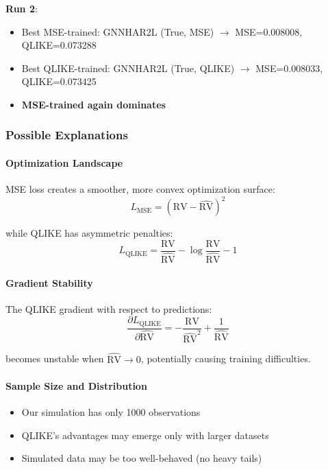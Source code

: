 \documentclass[10pt,a4paper]{article}
\newcommand{\RV}{\text{RV}}
\begin{document}
\textbf{Run 2}:
\begin{itemize}
\item Best MSE-trained: GNNHAR2L (True, MSE) $\to$ MSE=0.008008, QLIKE=0.073288
\item Best QLIKE-trained: GNNHAR2L (True, QLIKE) $\to$ MSE=0.008033, QLIKE=0.073425
\item \textbf{MSE-trained again dominates}
\end{itemize}

\subsubsection{Possible Explanations}

\paragraph{Optimization Landscape}
MSE loss creates a smoother, more convex optimization surface:
\begin{equation}
L_{\text{MSE}} = (\RV - \widehat{\RV})^2
\end{equation}

while QLIKE has asymmetric penalties:
\begin{equation}
L_{\text{QLIKE}} = \frac{\RV}{\widehat{\RV}} - \log\frac{\RV}{\widehat{\RV}} - 1
\end{equation}

\paragraph{Gradient Stability}
The QLIKE gradient with respect to predictions:
\begin{equation}
\frac{\partial L_{\text{QLIKE}}}{\partial \widehat{\RV}} = -\frac{\RV}{\widehat{\RV}^2} + \frac{1}{\widehat{\RV}}
\end{equation}

becomes unstable when $\widehat{\RV} \to 0$, potentially causing training difficulties.

\paragraph{Sample Size and Distribution}
\begin{itemize}
\item Our simulation has only 1000 observations
\item QLIKE's advantages may emerge only with larger datasets
\item Simulated data may be too well-behaved (no heavy tails)
\end{itemize}
\end{document}
